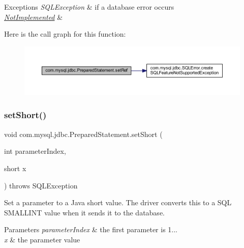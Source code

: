 \begin{DoxyExceptions}{Exceptions}
{\em S\+Q\+L\+Exception} & if a database error occurs \\
\hline
{\em \mbox{\hyperlink{classcom_1_1mysql_1_1jdbc_1_1_not_implemented}{Not\+Implemented}}} & \\
\hline
\end{DoxyExceptions}
Here is the call graph for this function\+:
\nopagebreak
\begin{figure}[H]
\begin{center}
\leavevmode
\includegraphics[width=350pt]{classcom_1_1mysql_1_1jdbc_1_1_prepared_statement_ae89f89fcb2083ed1bc44a04a7a5757b4_cgraph}
\end{center}
\end{figure}
\mbox{\label{classcom_1_1mysql_1_1jdbc_1_1_prepared_statement_a9ed8cafd89fc66eb155892b62a006c38}} 
\subsubsection{\texorpdfstring{set\+Short()}{setShort()}}
{\footnotesize\ttfamily void com.\+mysql.\+jdbc.\+Prepared\+Statement.\+set\+Short (\begin{DoxyParamCaption}\item[{int}]{parameter\+Index,  }\item[{short}]{x }\end{DoxyParamCaption}) throws S\+Q\+L\+Exception}

Set a parameter to a Java short value. The driver converts this to a S\+QL S\+M\+A\+L\+L\+I\+NT value when it sends it to the database.


\begin{DoxyParams}{Parameters}
{\em parameter\+Index} & the first parameter is 1... \\
\hline
{\em x} & the parameter value\\
\hline
\end{DoxyParams}

